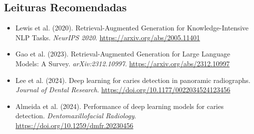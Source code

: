 \subsection*{Leituras Recomendadas}
\begin{itemize}
    \item Lewis et al. (2020). Retrieval-Augmented Generation for Knowledge-Intensive NLP Tasks. \textit{NeurIPS 2020}. \url{https://arxiv.org/abs/2005.11401}
    \item Gao et al. (2023). Retrieval-Augmented Generation for Large Language Models: A Survey. \textit{arXiv:2312.10997}. \url{https://arxiv.org/abs/2312.10997}
    \item Lee et al. (2024). Deep learning for caries detection in panoramic radiographs. \textit{Journal of Dental Research}. \url{https://doi.org/10.1177/0022034524123456}
    \item Almeida et al. (2024). Performance of deep learning models for caries detection. \textit{Dentomaxillofacial Radiology}. \url{https://doi.org/10.1259/dmfr.20230456}
\end{itemize}
